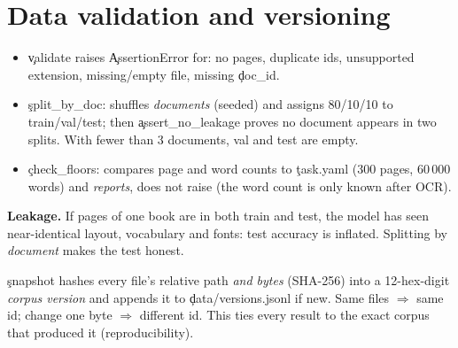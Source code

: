 \section{Data validation and versioning}
\begin{itemize}
 \item \c{validate} raises \c{AssertionError} for: no pages, duplicate ids, unsupported extension, missing/empty file, missing \c{doc\_id}.
 \item \c{split\_by\_doc}: shuffles \emph{documents} (seeded) and assigns 80/10/10 to train/val/test; then \c{assert\_no\_leakage} proves no document appears in two splits. With fewer than 3 documents, val and test are empty.
 \item \c{check\_floors}: compares page and word counts to \c{task.yaml} (300 pages, 60\,000 words) and \emph{reports}, does not raise (the word count is only known after OCR).
\end{itemize}
\begin{why}
\textbf{Leakage.} If pages of one book are in both train and test, the model has seen near-identical layout, vocabulary and fonts: test accuracy is inflated. Splitting by \emph{document} makes the test honest.
\end{why}
\c{snapshot} hashes every file's relative path \emph{and bytes} (SHA-256) into a 12-hex-digit \emph{corpus version} and appends it to \c{data/versions.jsonl} if new. Same files $\Rightarrow$ same id; change one byte $\Rightarrow$ different id. This ties every result to the exact corpus that produced it (reproducibility).

